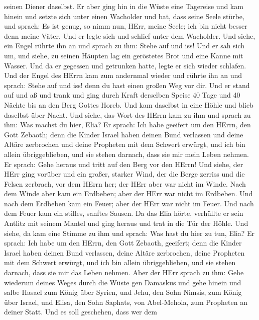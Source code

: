 seinen Diener daselbst.  Er aber ging hin in die Wüste eine
Tagereise und kam hinein und setzte sich unter einen Wacholder und bat,
dass seine Seele stürbe, und sprach: Es ist genug, so nimm nun, HErr,
meine Seele; ich bin nicht besser denn meine Väter.  Und er
legte sich und schlief unter dem Wacholder. Und siehe, ein Engel rührte
ihn an und sprach zu ihm: Stehe auf und iss!  Und er sah
sich um, und siehe, zu seinen Häupten lag ein geröstetes Brot und eine
Kanne mit Wasser. Und da er gegessen und getrunken hatte, legte er sich
wieder schlafen.  Und der Engel des HErrn kam zum andernmal
wieder und rührte ihn an und sprach: Stehe auf und iss! denn du hast
einen großen Weg vor dir.  Und er stand auf und aß und trank
und ging durch Kraft derselben Speise 40 Tage und 40 Nächte bis an den
Berg Gottes Horeb.  Und kam daselbst in eine Höhle und blieb
daselbst über Nacht. Und siehe, das Wort des HErrn kam zu ihm und sprach
zu ihm: Was machst du hier, Elia?  Er sprach: Ich habe
geeifert um den HErrn, den Gott Zebaoth; denn die Kinder Israel haben
deinen Bund verlassen und deine Altäre zerbrochen und deine Propheten
mit dem Schwert erwürgt, und ich bin allein übriggeblieben, und sie
stehen darnach, dass sie mir mein Leben nehmen.  Er sprach:
Gehe heraus und tritt auf den Berg vor den HErrn! Und siehe, der HErr
ging vorüber und ein großer, starker Wind, der die Berge zerriss und die
Felsen zerbrach, vor dem HErrn her; der HErr aber war nicht im Winde.
Nach dem Winde aber kam ein Erdbeben; aber der HErr war nicht im
Erdbeben.  Und nach dem Erdbeben kam ein Feuer; aber der
HErr war nicht im Feuer. Und nach dem Feuer kam ein stilles, sanftes
Sausen.  Da das Elia hörte, verhüllte er sein Antlitz mit
seinem Mantel und ging heraus und trat in die Tür der Höhle. Und siehe,
da kam eine Stimme zu ihm und sprach: Was hast du hier zu tun, Elia?
 Er sprach: Ich habe um den HErrn, den Gott Zebaoth,
geeifert; denn die Kinder Israel haben deinen Bund verlassen, deine
Altäre zerbrochen, deine Propheten mit dem Schwert erwürgt, und ich bin
allein übriggeblieben, und sie stehen darnach, dass sie mir das Leben
nehmen.  Aber der HErr sprach zu ihm: Gehe wiederum deines
Weges durch die Wüste gen Damaskus und gehe hinein und salbe Hasael zum
König über Syrien,  und Jehu, den Sohn Nimsis, zum König
über Israel, und Elisa, den Sohn Saphats, von Abel-Mehola, zum Propheten
an deiner Statt.  Und es soll geschehen, dass wer dem

